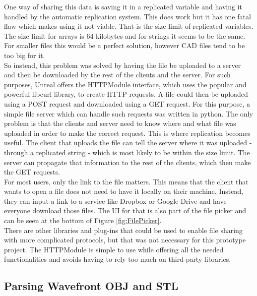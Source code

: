 One way of sharing this data is saving it in a replicated variable and having it handled by the automatic replication system. This does work but it has one fatal flaw which makes using it not viable. That is the size limit of replicated variables. The size limit for arrays is 64 kilobytes and for strings it seems to be the same. For smaller files this would be a perfect solution, however \acs{CAD} files tend to be too big for it.\\
So instead, this problem was solved by having the file be uploaded to a server and then be downloaded by the rest of the clients and the server. For such purposes, Unreal offers the HTTPModule interface, which uses the popular and powerful libcurl library, to create \acs{HTTP} requests\cite{bib:UELibC}. A file could then be uploaded using a POST request and downloaded using a GET request. For this purpose, a simple file server which can handle such requests was written in python. The only problem is that the clients and server need to know where and what file was uploaded in order to make the correct request. This is where replication becomes useful. The client that uploads the file can tell the server where it was uploaded - through a replicated string - which is most likely to be within the size limit. The server can propagate that information to the rest of the clients, which then make the GET requests.\\
For most users, only the link to the file matters. This means that the client that wants to open a file does not need to have it locally on their machine. Instead, they can input a link to a service like Dropbox or Google Drive and have everyone download those files. The UI for that is also part of the file picker and can be seen at the bottom of Figure \ref{fig:FilePicker}.\\
There are other libraries and plug-ins that could be used to enable file sharing with more complicated protocols, but that was not necessary for this prototype project. The HTTPModule is simple to use while offering all the needed functionalities and avoids having to rely too much on third-party libraries.
\subsection{Parsing Wavefront OBJ and STL}

